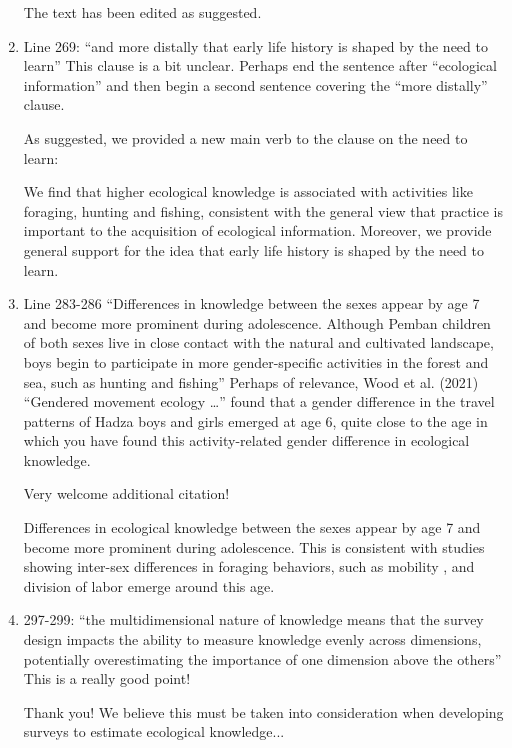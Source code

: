 \documentclass{article}
\newcommand{\rev}[1]{{\color{Red}#1}}
\newcommand{\comment}[1]{{\color{Blue}#1}}
\begin{document}
\begin{enumerate}
    \comment{The text has been edited as suggested. }

    \item Line 269: “and more distally that early life history is shaped by the need to learn” This clause is a bit unclear. Perhaps end the sentence after “ecological information” and then begin a second sentence covering the “more distally” clause.
    
    \comment{As suggested, we provided a new main verb to the clause on the need to learn: }
    
    \rev{We find that higher ecological knowledge is associated with activities like foraging, hunting and fishing, consistent with the general view that practice is important to the acquisition of ecological information. Moreover, we provide general support for the idea that early life history is shaped by the need to learn. }

    \item Line 283-286 “Differences in knowledge between the sexes appear by age 7 and become more prominent during adolescence. Although Pemban children of both sexes live in close contact with the natural and cultivated landscape, boys begin to participate in more gender-specific activities in the forest and sea, such as hunting and fishing” Perhaps of relevance, Wood et al. (2021) “Gendered movement ecology …” found that a gender difference in the travel patterns of Hadza boys and girls emerged at age 6, quite close to the age in which you have found this activity-related gender difference in ecological knowledge.
    
    \comment{Very welcome additional citation!}
    
    \rev{Differences in ecological knowledge between the sexes appear by age 7 and become more prominent during adolescence. This is consistent with studies showing inter-sex differences in foraging behaviors, such as mobility \citep{Wood2021GenderedHunter-gatherers}, and division of labor \citep{Lew-Levy2017HowReview,Lew-Levy2022SocioecologySocieties} emerge around this age. }

    \item 297-299: “the multidimensional nature of knowledge means that the survey design impacts the ability to measure knowledge evenly across dimensions, potentially overestimating the importance of one dimension above the others” This is a really good point!
    
    \comment{Thank you! We believe this must be taken into consideration when developing surveys to estimate ecological knowledge...}


\end{enumerate}
\end{document}
